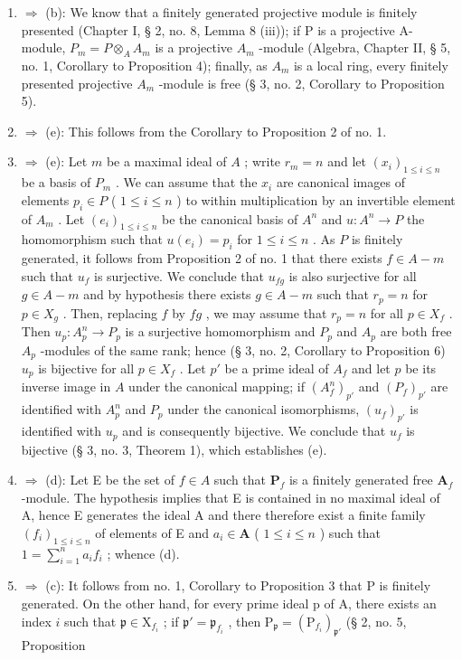 \begin{enumerate}
\def\labelenumi{(\alph{enumi})}
\item
  \(\Rightarrow\) (b): We know that a finitely generated projective module is finitely presented (Chapter I, § 2, no. 8, Lemma 8 (iii)); if P is a projective A-module, \(P_{m} = P \otimes_{A} A_{m}\) is a projective \(A_{m}\) -module (Algebra, Chapter II, § 5, no. 1, Corollary to Proposition 4); finally, as \(A_{m}\) is a local ring, every finitely presented projective \(A_{m}\) -module is free (§ 3, no. 2, Corollary to Proposition 5).
\item
  \(\Rightarrow\) (e): This follows from the Corollary to Proposition 2 of no. 1.
\item
  \(\Rightarrow\) (e): Let \(m\) be a maximal ideal of \(A\) ; write \(r_m = n\) and let \((x_i)_{1 \leqslant i \leqslant n}\) be a basis of \(P_m\) . We can assume that the \(x_i\) are canonical images of elements \(p_i \in P\) ( \(1 \leqslant i \leqslant n\) ) to within multiplication by an invertible element of \(A_m\) . Let \((e_i)_{1 \leqslant i \leqslant n}\) be the canonical basis of \(A^n\) and \(u: A^n \to P\) the homomorphism such that \(u(e_i) = p_i\) for \(1 \leqslant i \leqslant n\) . As \(P\) is finitely generated, it follows from Proposition 2 of no. 1 that there exists \(f \in A - m\) such that \(u_f\) is surjective. We conclude that \(u_{fg}\) is also surjective for all \(g \in A - m\) and by hypothesis there exists \(g \in A - m\) such that \(r_p = n\) for \(p \in X_g\) . Then, replacing \(f\) by \(fg\) , we may assume that \(r_p = n\) for all \(p \in X_f\) . Then \(u_p: A_p^n \to P_p\) is a surjective homomorphism and \(P_p\) and \(A_p\) are both free \(A_p\) -modules of the same rank; hence (§ 3, no. 2, Corollary to Proposition 6) \(u_p\) is bijective for all \(p \in X_f\) . Let \(p'\) be a prime ideal of \(A_f\) and let \(p\) be its inverse image in \(A\) under the canonical mapping; if \((A_f^n)_{p'}\) and \((P_f)_{p'}\) are identified with \(A_p^n\) and \(P_p\) under the canonical isomorphisms, \((u_f)_{p'}\) is identified with \(u_p\) and is consequently bijective. We conclude that \(u_f\) is bijective (§ 3, no. 3, Theorem 1), which establishes (e).
\item
  \(\Rightarrow\) (d): Let E be the set of \(f\in A\) such that \(\mathbf{P}_f\) is a finitely generated free \(\mathbf{A}_f\) -module. The hypothesis implies that E is contained in no maximal ideal of A, hence E generates the ideal A and there therefore exist a finite family \((f_{i})_{1 \leqslant i \leqslant n}\) of elements of E and \(a_{i} \in \mathbf{A}\) ( \(1 \leqslant i \leqslant n\) ) such that \(1 = \sum_{i=1}^{n} a_{i} f_{i}\) ; whence (d).
\item
  \(\Rightarrow\) (c): It follows from no. 1, Corollary to Proposition 3 that P is finitely generated. On the other hand, for every prime ideal p of A, there exists an index \(i\) such that \(\mathfrak{p} \in \mathrm{X}_{f_i}\) ; if \(\mathfrak{p}' = \mathfrak{p}_{f_i}\) , then \(\mathrm{P}_{\mathfrak{p}} = (\mathrm{P}_{f_i})_{\mathfrak{p}'}\) (§ 2, no. 5, Proposition
\end{enumerate}

